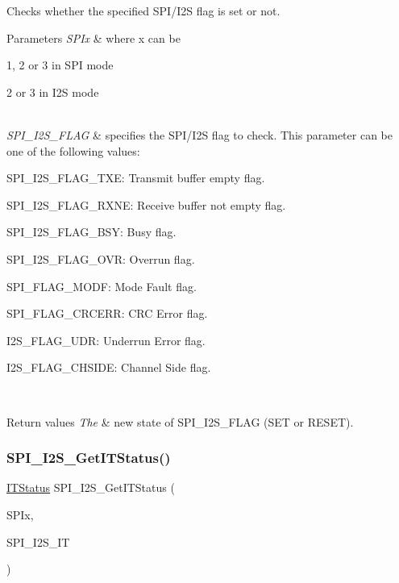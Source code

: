 Checks whether the specified S\+P\+I/\+I2S flag is set or not. 


\begin{DoxyParams}{Parameters}
{\em S\+P\+Ix} & where x can be
\begin{DoxyItemize}
\item 1, 2 or 3 in S\+PI mode
\item 2 or 3 in I2S mode 
\end{DoxyItemize}\\
\hline
{\em S\+P\+I\+\_\+\+I2\+S\+\_\+\+F\+L\+AG} & specifies the S\+P\+I/\+I2S flag to check. This parameter can be one of the following values\+: \begin{DoxyItemize}
\item S\+P\+I\+\_\+\+I2\+S\+\_\+\+F\+L\+A\+G\+\_\+\+T\+XE\+: Transmit buffer empty flag. \item S\+P\+I\+\_\+\+I2\+S\+\_\+\+F\+L\+A\+G\+\_\+\+R\+X\+NE\+: Receive buffer not empty flag. \item S\+P\+I\+\_\+\+I2\+S\+\_\+\+F\+L\+A\+G\+\_\+\+B\+SY\+: Busy flag. \item S\+P\+I\+\_\+\+I2\+S\+\_\+\+F\+L\+A\+G\+\_\+\+O\+VR\+: Overrun flag. \item S\+P\+I\+\_\+\+F\+L\+A\+G\+\_\+\+M\+O\+DF\+: Mode Fault flag. \item S\+P\+I\+\_\+\+F\+L\+A\+G\+\_\+\+C\+R\+C\+E\+RR\+: C\+RC Error flag. \item I2\+S\+\_\+\+F\+L\+A\+G\+\_\+\+U\+DR\+: Underrun Error flag. \item I2\+S\+\_\+\+F\+L\+A\+G\+\_\+\+C\+H\+S\+I\+DE\+: Channel Side flag. \end{DoxyItemize}
\\
\hline
\end{DoxyParams}

\begin{DoxyRetVals}{Return values}
{\em The} & new state of S\+P\+I\+\_\+\+I2\+S\+\_\+\+F\+L\+AG (S\+ET or R\+E\+S\+ET). \\
\hline
\end{DoxyRetVals}
\mbox{\label{group___s_p_i___exported___functions_ga72decbc1cd79f8fad92a2204beca6bc5}} 
\subsubsection{\texorpdfstring{SPI\_I2S\_GetITStatus()}{SPI\_I2S\_GetITStatus()}}
{\footnotesize\ttfamily \mbox{\hyperlink{group___exported__types_gaacbd7ed539db0aacd973a0f6eca34074}{I\+T\+Status}} S\+P\+I\+\_\+\+I2\+S\+\_\+\+Get\+I\+T\+Status (\begin{DoxyParamCaption}\item[{\mbox{\hyperlink{struct_s_p_i___type_def}{S\+P\+I\+\_\+\+Type\+Def}} $\ast$}]{S\+P\+Ix,  }\item[{uint8\+\_\+t}]{S\+P\+I\+\_\+\+I2\+S\+\_\+\+IT }\end{DoxyParamCaption})}



